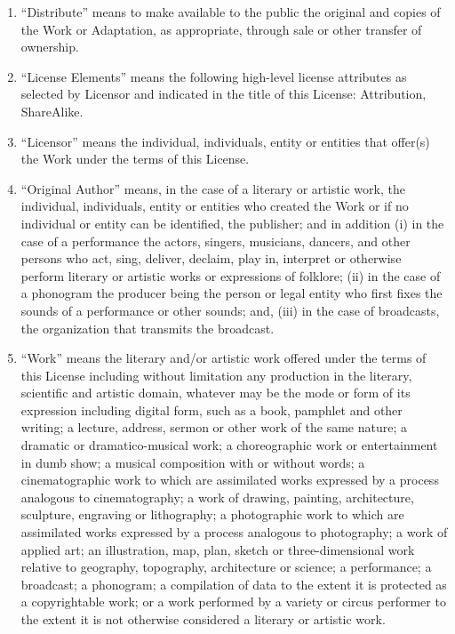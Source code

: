 \documentclass[letterpaper,10pt,english]{manual}
\begin{document}
\begin{enumerate}
\begin{enumerate}
\item {} 
``Distribute'' means to make available to the public the original and copies of the Work or Adaptation, as appropriate, through sale or other transfer of ownership.

\item {} 
``License Elements'' means the following high-level license attributes as selected by Licensor and indicated in the title of this License: Attribution, ShareAlike.

\item {} 
``Licensor'' means the individual, individuals, entity or entities that offer(s) the Work under the terms of this License.

\item {} 
``Original Author'' means, in the case of a literary or artistic work, the individual, individuals, entity or entities who created the Work or if no individual or entity can be identified, the publisher; and in addition (i) in the case of a performance the actors, singers, musicians, dancers, and other persons who act, sing, deliver, declaim, play in, interpret or otherwise perform literary or artistic works or expressions of folklore; (ii) in the case of a phonogram the producer being the person or legal entity who first fixes the sounds of a performance or other sounds; and, (iii) in the case of broadcasts, the organization that transmits the broadcast.

\item {} 
``Work'' means the literary and/or artistic work offered under the terms of this License including without limitation any production in the literary, scientific and artistic domain, whatever may be the mode or form of its expression including digital form, such as a book, pamphlet and other writing; a lecture, address, sermon or other work of the same nature; a dramatic or dramatico-musical work; a choreographic work or entertainment in dumb show; a musical composition with or without words; a cinematographic work to which are assimilated works expressed by a process analogous to cinematography; a work of drawing, painting, architecture, sculpture, engraving or lithography; a photographic work to which are assimilated works expressed by a process analogous to photography; a work of applied art; an illustration, map, plan, sketch or three-dimensional work relative to geography, topography, architecture or science; a performance; a broadcast; a phonogram; a compilation of data to the extent it is protected as a copyrightable work; or a work performed by a variety or circus performer to the extent it is not otherwise considered a literary or artistic work.


\end{enumerate}
\end{enumerate}
\end{document}
